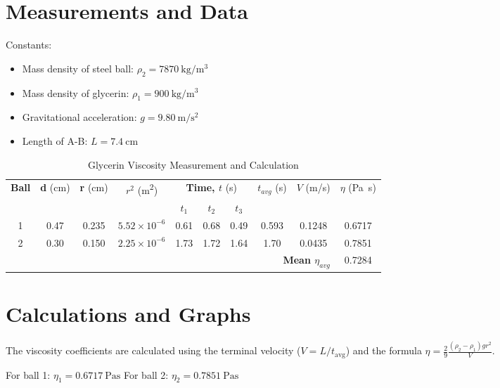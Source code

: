 \documentclass[12pt, a4paper]{article}
\begin{document}
\section{Measurements and Data}
Constants:
\begin{itemize}
	\item Mass density of steel ball: $\rho_2 = \SI{7870}{\kilo\gram\per\metre\cubed}$
	\item Mass density of glycerin: $\rho_1 = \SI{900}{\kilo\gram\per\metre\cubed}$
	\item Gravitational acceleration: $g = \SI{9.80}{\metre\per\second\squared}$
	\item Length of A-B: $L = \SI{7.4}{\centi\meter}$
\end{itemize}

\begin{small}
	\begin{longtable}{|c|c|c|c|c|c|c|c|c|c|}
		\caption{Glycerin Viscosity Measurement and Calculation} \label{tab:olcum} \\
		\hline
		\textbf{Ball} & \textbf{d} (\si{cm}) & \textbf{r} (\si{cm}) & \textbf{$r^2$} (\si{m^2}) & \multicolumn{3}{c|}{\textbf{Time, $t$} (\si{s})} & \textbf{$t_{avg}$} (\si{s}) & \textbf{$V$} (\si{m/s}) & \textbf{$\eta$} (\si{Pa.s}) \\
		\cline{5-7}
		  &        &         &                       & \textbf{$t_1$} & \textbf{$t_2$} & \textbf{$t_3$} &       &        &        \\
		\hline
		1 & 0.47 & 0.235 & $5.52 \times 10^{-6}$ & 0.61           & 0.68           & 0.49           & 0.593 & 0.1248 & 0.6717 \\
		2 & 0.30 & 0.150 & $2.25 \times 10^{-6}$ & 1.73           & 1.72           & 1.64           & 1.70  & 0.0435 & 0.7851 \\
		\hline
		\multicolumn{9}{|r|}{\textbf{Mean $\eta_{avg}$}} & 0.7284 \\
		\hline
	\end{longtable}
\end{small}

\section{Calculations and Graphs}
The viscosity coefficients are calculated using the terminal velocity ($V = L / t_{\text{avg}}$) and the formula $\eta = \frac{2}{9} \frac{(\rho_2 - \rho_1) g r^2}{V}$.

For ball 1: $\eta_1 = \SI{0.6717}{\pascal\second}$  
For ball 2: $\eta_2 = \SI{0.7851}{\pascal\second}$  
\end{document}
